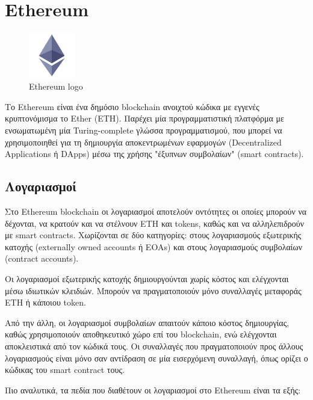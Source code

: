 \section{Ethereum} \label{section:2-6-ethereum}

\begin{figure}[H]
	\centering
	\includegraphics[width=2cm]{assets/figures/chapter-2/2.6.ethereum-logo.png}
	\caption{Ethereum logo}
\end{figure}

Το Ethereum είναι ένα δημόσιο blockchain ανοιχτού κώδικα με εγγενές κρυπτονόμισμα το Ether (ETH). Παρέχει μία προγραμματιστική πλατφόρμα με ενσωματωμένη μία Turing-complete γλώσσα προγραμματισμού, που μπορεί να χρησιμοποιηθεί για τη δημιουργία αποκεντρωμένων εφαρμογών (Decentralized Applications ή DApps) μέσω της χρήσης "έξυπνων συμβολαίων" (smart contracts).\cite{2.6-ethereum-whitepaper}

\subsection{Λογαριασμοί} \label{subsection:2-6-1-ethereum-accounts}
Στο Ethereum blockchain οι λογαριασμοί αποτελούν οντότητες οι οποίες μπορούν να δέχονται, να κρατούν και να στέλνουν ETH και tokens, καθώς και να αλληλεπιδρούν με smart contracts.\cite{2.6-ethereum-documentation} Χωρίζονται σε δύο κατηγορίες: στους λογαριασμούς εξωτερικής κατοχής (\textenglish{externally owned accounts} ή EOAs) και στους λογαριασμούς συμβολαίων (contract accounts).

Οι λογαριασμοί εξωτερικής κατοχής δημιουργούνται χωρίς κόστος και ελέγχονται μέσω ιδιωτικών κλειδιών. Μπορούν να πραγματοποιούν μόνο συναλλαγές μεταφοράς ETH ή κάποιου token.

Από την άλλη, οι λογαριασμοί συμβολαίων απαιτούν κάποιο κόστος δημιουργίας, καθώς χρησιμοποιούν αποθηκευτικό χώρο επί του blockchain, ενώ ελέγχονται αποκλειστικά από τον κώδικά τους. Οι συναλλαγές που πραγματοποιούν προς άλλους λογαριασμούς είναι μόνο σαν αντίδραση σε μία εισερχόμενη συναλλαγή, όπως ορίζει ο κώδικας του smart contract τους.

Πιο αναλυτικά, τα πεδία που διαθέτουν οι λογαριασμοί στο Ethereum είναι τα εξής:

